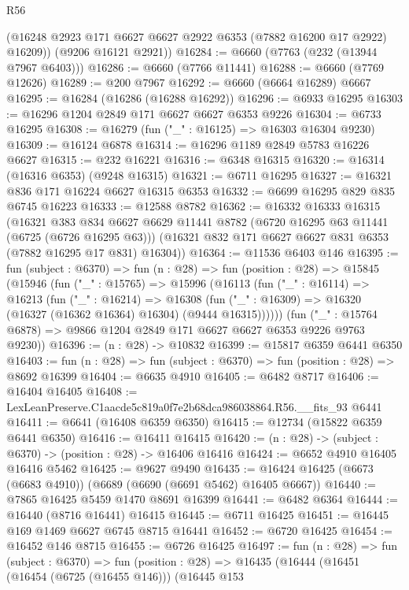 \begin{lexlean}{R56}
\begin{coremodule}
        (@16248 @2923 @171 @6627 @6627 @2922 @6353 (@7882 @16200 @17 @2922) @16209))
      (@9206 @16121 @2921))
@16284 := @6660 (@7763 (@232 (@13944 @7967 @6403)))
@16286 := @6660 (@7766 @11441)
@16288 := @6660 (@7769 @12626)
@16289 := @200 @7967
@16292 := @6660 (@6664 @16289) @6667
@16295 := @16284 (@16286 (@16288 @16292))
@16296 := @6933 @16295
@16303 := @16296 @1204 @2849 @171 @6627 @6627 @6353 @9226
@16304 := @6733 @16295
@16308 := @16279 (fun ("_" : @16125) => @16303 @16304 @9230)
@16309 := @16124 @6878
@16314 := @16296 @1189 @2849 @5783 @16226 @6627
@16315 := @232 @16221
@16316 := @6348 @16315
@16320 := @16314 (@16316 @6353) (@9248 @16315)
@16321 := @6711 @16295
@16327 := @16321 @836 @171 @16224 @6627 @16315 @6353
@16332 := @6699 @16295 @829 @835 @6745 @16223
@16333 := @12588 @8782
@16362 := @16332
    @16333
    @16315
    (@16321
      @383
      @834
      @6627
      @6629
      @11441
      @8782
      (@6720 @16295 @63 @11441 (@6725 (@6726 @16295 @63)))
      (@16321 @832 @171 @6627 @6627 @831 @6353 (@7882 @16295 @17 @831) @16304))
@16364 := @11536 @6403 @146
@16395 := fun (subject : @6370) =>
  fun (n : @28) =>
  fun (position : @28) =>
  @15845
    (@15946
      (fun ("_" : @15765) =>
      @15996
        (@16113
          (fun ("_" : @16114) =>
          @16213
            (fun ("_" : @16214) =>
            @16308 (fun ("_" : @16309) => @16320 (@16327 (@16362 @16364) @16304) (@9444 @16315))))))
      (fun ("_" : @15764 @6878) => @9866 @1204 @2849 @171 @6627 @6627 @6353 @9226 @9763 @9230))
@16396 := (n : @28) -> @10832
@16399 := @15817 @6359 @6441 @6350
@16403 := fun (n : @28) => fun (subject : @6370) => fun (position : @28) => @8692 @16399
@16404 := @6635 @4910
@16405 := @6482 @8717
@16406 := @16404 @16405
@16408 := LexLeanPreserve.C1aacde5c819a0f7e2b68dca986038864.R56.__fits_93 @6441
@16411 := @6641 (@16408 @6359 @6350)
@16415 := @12734 (@15822 @6359 @6441 @6350)
@16416 := @16411 @16415
@16420 := (n : @28) -> (subject : @6370) -> (position : @28) -> @16406 @16416
@16424 := @6652 @4910 @16405 @16416 @5462
@16425 := @9627 @9490
@16435 := @16424 @16425 (@6673 (@6683 @4910)) (@6689 (@6690 (@6691 @5462) @16405 @6667))
@16440 := @7865 @16425 @5459 @1470 @8691 @16399
@16441 := @6482 @6364
@16444 := @16440 (@8716 @16441) @16415
@16445 := @6711 @16425
@16451 := @16445 @169 @1469 @6627 @6745 @8715 @16441
@16452 := @6720 @16425
@16454 := @16452 @146 @8715
@16455 := @6726 @16425
@16497 := fun (n : @28) =>
  fun (subject : @6370) =>
  fun (position : @28) =>
  @16435
    (@16444
      (@16451
        (@16454 (@6725 (@16455 @146)))
        (@16445
          @153

\end{coremodule}
\end{lexlean}
